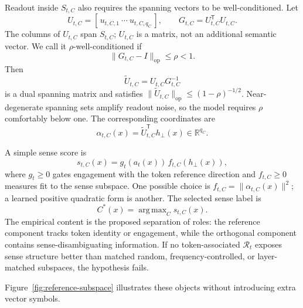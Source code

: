\documentclass[
  aps,
  reprint,
  superscriptaddress,
  floatfix,
  nofootinbib,
  longbibliography
]{revtex4-2}
\newcommand{\R}{\mathbb{R}}
\newcommand{\T}{^{\mathsf{T}}}
\newcommand{\opnorm}[1]{\lVert #1 \rVert_{\mathrm{op}}}
\newcommand{\norm}[1]{\lVert #1 \rVert}
\DeclareMathOperator*{\argmax}{arg\,max}
\begin{document}
Readout inside $S_{t,C}$ also requires the spanning vectors to be
well-conditioned. Let
%
\begin{equation}
U_{t,C}=[\,u_{t,C,1}\ \cdots\ u_{t,C,q_C}\,],
\qquad
G_{t,C}=U_{t,C}\T U_{t,C}.
\end{equation}
%
The columns of $U_{t,C}$ span $S_{t,C}$; $U_{t,C}$ is a matrix, not an
additional semantic vector. We call it $\rho$-well-conditioned if
%
\begin{equation}
\label{eq:rho-stable}
\opnorm{G_{t,C}-I}\le\rho<1.
\end{equation}
%
Then
%
\begin{equation}
\label{eq:dual-spanning}
\widetilde U_{t,C}=U_{t,C}G_{t,C}^{-1}
\end{equation}
%
is a dual spanning matrix and satisfies
$\opnorm{\widetilde U_{t,C}}\le(1-\rho)^{-1/2}$. Near-degenerate spanning
sets amplify readout noise, so the model requires $\rho$ comfortably below
one. The corresponding coordinates are
%
\begin{equation}
\label{eq:alpha}
\alpha_{t,C}(x)=\widetilde U_{t,C}\T h_\perp(x)
\in\R^{q_C}.
\end{equation}
%

A simple sense score is
%
\begin{equation}
\label{eq:sense-score}
s_{t,C}(x)=g_t(a_t(x))\,f_{t,C}(h_\perp(x)),
\end{equation}
%
where $g_t\ge0$ gates engagement with the token reference direction and
$f_{t,C}\ge0$ measures fit to the sense subspace. One possible choice is
$f_{t,C}=\norm{\alpha_{t,C}(x)}^2$; a learned positive quadratic form is
another. The selected sense label is
%
\begin{equation}
\label{eq:selected-sense}
C^*(x)=\argmax_C s_{t,C}(x).
\end{equation}
%
The empirical content is the proposed separation of roles: the reference
component tracks token identity or engagement, while the orthogonal
component contains sense-disambiguating information. If no token-associated
$\mathcal R_t$ exposes sense structure better than matched random,
frequency-controlled, or layer-matched subspaces, the hypothesis fails.

Figure~\ref{fig:reference-subspace} illustrates these objects without
introducing extra vector symbols.
\end{document}
